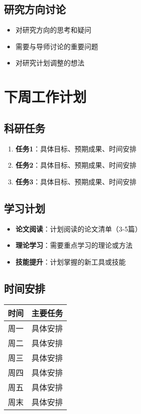 \documentclass[12pt,a4paper]{article}
\begin{document}
\subsection{研究方向讨论}
\begin{itemize}
    \item 对研究方向的思考和疑问
    \item 需要与导师讨论的重要问题
    \item 对研究计划调整的想法
\end{itemize}

\section{下周工作计划}

\subsection{科研任务}
\begin{enumerate}
    \item \textbf{任务1}：具体目标、预期成果、时间安排
    \item \textbf{任务2}：具体目标、预期成果、时间安排
    \item \textbf{任务3}：具体目标、预期成果、时间安排
\end{enumerate}

\subsection{学习计划}
\begin{itemize}
    \item \textbf{论文阅读}：计划阅读的论文清单（3-5篇）
    \item \textbf{理论学习}：需要重点学习的理论或方法
    \item \textbf{技能提升}：计划掌握的新工具或技能
\end{itemize}

\subsection{时间安排}
\begin{center}
\begin{tabular}{|c|p{12cm}|}
\hline
\textbf{时间} & \textbf{主要任务} \\
\hline
周一 & 具体安排 \\
\hline
周二 & 具体安排 \\
\hline
周三 & 具体安排 \\
\hline
周四 & 具体安排 \\
\hline
周五 & 具体安排 \\
\hline
周末 & 具体安排 \\
\hline
\end{tabular}
\end{center}
\end{document}

